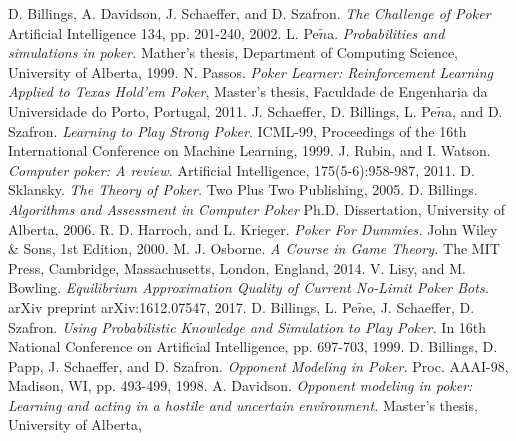 
\begin{thebibliography}{9}
D. Billings, A. Davidson, J. Schaeffer, and D. Szafron.
\textit{The Challenge of Poker}
Artificial Intelligence 134, pp. 201-240, 2002.
  L. Pe$\tilde{n}$a.
  \textit{Probabilities and simulations in poker.}
  Mather's thesis, Department of Computing Science, University of Alberta,
  1999.
  N. Passos.
  \textit{Poker Learner: Reinforcement Learning Applied to Texas Hold'em Poker},
  Master's thesis, Faculdade de Engenharia da Universidade do Porto, Portugal, 
  2011.
  \href{https://paginas.fe.up.pt/$\sim$ei08029/Master\%20Thesis\%20-\%20Nuno\%20Passos.pdf}{}
   J. Schaeffer, D. Billings, L. Pe$\tilde{n}$a, and D. Szafron.
  \textit{Learning to Play Strong Poker}.
  ICML-99, Proceedings of the 16th International Conference on Machine Learning, 
  1999.
  \href{http://poker.cs.ualberta.ca/publications/ICML99.pdf}{}
  J. Rubin, and I. Watson.
  \textit{Computer poker: A review.}
   Artificial Intelligence, 175(5-6):958-987,
  2011.
  D. Sklansky.
  \textit{The Theory of Poker.}
   Two Plus Two Publishing,
  2005.
  D. Billings.
  \textit{Algorithms and Assessment in Computer Poker}
   Ph.D. Dissertation, University of Alberta,
  2006.
  R. D. Harroch, and L. Krieger.
  \textit{Poker For Dummies.}
   John Wiley \& Sons, 1st Edition,
  2000.
  M. J. Osborne.
  \textit{A Course in Game Theory.}
   The MIT Press, Cambridge, Massachusetts, London, England,
  2014.
  V. Lisy, and M. Bowling.
  \textit{Equilibrium Approximation Quality of Current No-Limit Poker Bots.}
   arXiv preprint arXiv:1612.07547,
  2017.
  D. Billings, L. Pe$\tilde{n}$e, J. Schaeffer, D. Szafron.
  \textit{Using Probabilistic Knowledge and Simulation to Play Poker.}
   In 16th National Conference on Artificial
Intelligence, pp. 697-703,
  1999.
  D. Billings, D. Papp, J. Schaeffer, and D. Szafron.
  \textit{Opponent Modeling in Poker.}
   Proc. AAAI-98, Madison, WI, pp. 493-499,
  1998.
  A. Davidson.
  \textit{Opponent modeling in poker: Learning and acting in a hostile and uncertain environment.}
   Master’s thesis, University of Alberta, 

\end{thebibliography}
